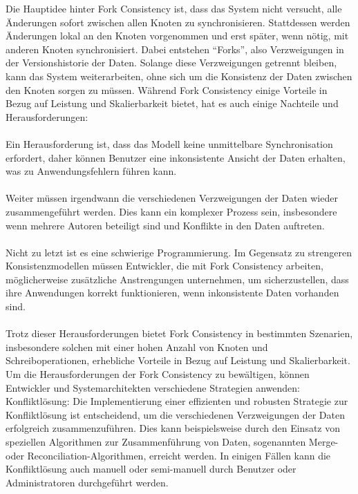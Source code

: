 \documentclass[../vs-script-first-v01.tex]{subfiles}
\begin{document}
Die Hauptidee hinter Fork Consistency ist, dass das System nicht versucht, alle Änderungen sofort zwischen allen Knoten zu synchronisieren. Stattdessen werden Änderungen lokal an den Knoten vorgenommen und erst später, wenn nötig, mit anderen Knoten synchronisiert. Dabei entstehen \enquote{Forks}, also Verzweigungen in der Versionshistorie der Daten. Solange diese Verzweigungen getrennt bleiben, kann das System weiterarbeiten, ohne sich um die Konsistenz der Daten zwischen den Knoten sorgen zu müssen.
Während Fork Consistency einige Vorteile in Bezug auf Leistung und Skalierbarkeit bietet, hat es auch einige Nachteile und Herausforderungen:
\\\\
Ein Herausforderung ist, dass das Modell keine unmittelbare Synchronisation erfordert, daher können Benutzer eine inkonsistente Ansicht der Daten erhalten, was zu Anwendungsfehlern führen kann.
\\\\
Weiter müssen irgendwann die verschiedenen Verzweigungen der Daten wieder zusammengeführt werden. Dies kann ein komplexer Prozess sein, insbesondere wenn mehrere Autoren beteiligt sind und Konflikte in den Daten auftreten.
\\\\
Nicht zu letzt ist es eine schwierige Programmierung. Im Gegensatz zu strengeren Konsistenzmodellen müssen Entwickler, die mit Fork Consistency arbeiten, möglicherweise zusätzliche Anstrengungen unternehmen, um sicherzustellen, dass ihre Anwendungen korrekt funktionieren, wenn inkonsistente Daten vorhanden sind.
\\\\
Trotz dieser Herausforderungen bietet Fork Consistency in bestimmten Szenarien, insbesondere solchen mit einer hohen Anzahl von Knoten und Schreiboperationen, erhebliche Vorteile in Bezug auf Leistung und Skalierbarkeit. Um die Herausforderungen der Fork Consistency zu bewältigen, können Entwickler und Systemarchitekten verschiedene Strategien anwenden:
Konfliktlösung: Die Implementierung einer effizienten und robusten Strategie zur Konfliktlösung ist entscheidend, um die verschiedenen Verzweigungen der Daten erfolgreich zusammenzuführen. Dies kann beispielsweise durch den Einsatz von speziellen Algorithmen zur Zusammenführung von Daten, sogenannten Merge- oder Reconciliation-Algorithmen, erreicht werden. In einigen Fällen kann die Konfliktlösung auch manuell oder semi-manuell durch Benutzer oder Administratoren durchgeführt werden.
\end{document}
